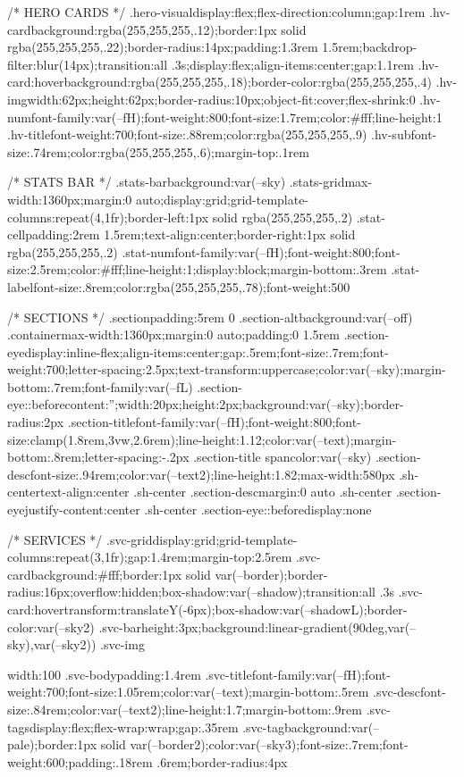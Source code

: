 {{{{{{{{/* HERO CARDS */
.hero-visual{display:flex;flex-direction:column;gap:1rem}
.hv-card{background:rgba(255,255,255,.12);border:1px solid rgba(255,255,255,.22);border-radius:14px;padding:1.3rem 1.5rem;backdrop-filter:blur(14px);transition:all .3s;display:flex;align-items:center;gap:1.1rem}
.hv-card:hover{background:rgba(255,255,255,.18);border-color:rgba(255,255,255,.4)}
.hv-img{width:62px;height:62px;border-radius:10px;object-fit:cover;flex-shrink:0}
.hv-num{font-family:var(--fH);font-weight:800;font-size:1.7rem;color:#fff;line-height:1}
.hv-title{font-weight:700;font-size:.88rem;color:rgba(255,255,255,.9)}
.hv-sub{font-size:.74rem;color:rgba(255,255,255,.6);margin-top:.1rem}

/* STATS BAR */
.stats-bar{background:var(--sky)}
.stats-grid{max-width:1360px;margin:0 auto;display:grid;grid-template-columns:repeat(4,1fr);border-left:1px solid rgba(255,255,255,.2)}
.stat-cell{padding:2rem 1.5rem;text-align:center;border-right:1px solid rgba(255,255,255,.2)}
.stat-num{font-family:var(--fH);font-weight:800;font-size:2.5rem;color:#fff;line-height:1;display:block;margin-bottom:.3rem}
.stat-label{font-size:.8rem;color:rgba(255,255,255,.78);font-weight:500}

/* SECTIONS */
.section{padding:5rem 0}
.section-alt{background:var(--off)}
.container{max-width:1360px;margin:0 auto;padding:0 1.5rem}
.section-eye{display:inline-flex;align-items:center;gap:.5rem;font-size:.7rem;font-weight:700;letter-spacing:2.5px;text-transform:uppercase;color:var(--sky);margin-bottom:.7rem;font-family:var(--fL)}
.section-eye::before{content:'';width:20px;height:2px;background:var(--sky);border-radius:2px}
.section-title{font-family:var(--fH);font-weight:800;font-size:clamp(1.8rem,3vw,2.6rem);line-height:1.12;color:var(--text);margin-bottom:.8rem;letter-spacing:-.2px}
.section-title span{color:var(--sky)}
.section-desc{font-size:.94rem;color:var(--text2);line-height:1.82;max-width:580px}
.sh-center{text-align:center}
.sh-center .section-desc{margin:0 auto}
.sh-center .section-eye{justify-content:center}
.sh-center .section-eye::before{display:none}

/* SERVICES */
.svc-grid{display:grid;grid-template-columns:repeat(3,1fr);gap:1.4rem;margin-top:2.5rem}
.svc-card{background:#fff;border:1px solid var(--border);border-radius:16px;overflow:hidden;box-shadow:var(--shadow);transition:all .3s}
.svc-card:hover{transform:translateY(-6px);box-shadow:var(--shadowL);border-color:var(--sky2)}
.svc-bar{height:3px;background:linear-gradient(90deg,var(--sky),var(--sky2))}
.svc-img{width:100%
.svc-body{padding:1.4rem}
.svc-title{font-family:var(--fH);font-weight:700;font-size:1.05rem;color:var(--text);margin-bottom:.5rem}
.svc-desc{font-size:.84rem;color:var(--text2);line-height:1.7;margin-bottom:.9rem}
.svc-tags{display:flex;flex-wrap:wrap;gap:.35rem}
.svc-tag{background:var(--pale);border:1px solid var(--border2);color:var(--sky3);font-size:.7rem;font-weight:600;padding:.18rem .6rem;border-radius:4px}

}}}}}}}}}
